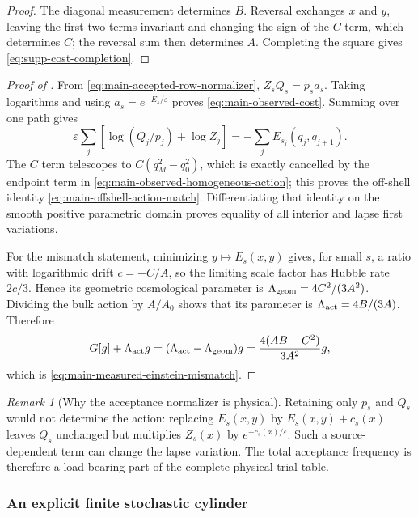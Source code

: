 \documentclass[11pt]{article}
\numberwithin{equation}{section}
\theoremstyle{definition}
\theoremstyle{remark}
\newtheorem{remark}[remark]{Remark}
\begin{document}
\begin{proof}
The diagonal measurement determines $B$.  Reversal exchanges $x$ and $y$,
leaving the first two terms invariant and changing the sign of the $C$ term,
which determines $C$; the reversal sum then determines $A$.  Completing the
square gives \eqref{eq:supp-cost-completion}.
\end{proof}

\begin{proof}[Proof of ]
From \eqref{eq:main-accepted-row-normalizer},
$Z_sQ_s=p_sa_s$.  Taking logarithms and using
$a_s=e^{-E_s/\varepsilon}$ proves \eqref{eq:main-observed-cost}.  Summing over
one path gives
\[
 \varepsilon\sum_j\left[\log(Q_j/p_j)+\log Z_j\right]
 =-\sum_jE_{s_j}(q_j,q_{j+1}).
\]
The $C$ term telescopes to $C(q_M^2-q_0^2)$, which is exactly cancelled by the
endpoint term in \eqref{eq:main-observed-homogeneous-action}; this proves the
off-shell identity \eqref{eq:main-offshell-action-match}.  Differentiating that
identity on the smooth positive parametric domain proves equality of all
interior and lapse first variations.

For the mismatch statement, minimizing $y\mapsto E_s(x,y)$ gives, for small
$s$, a ratio with logarithmic drift $c=-C/A$, so the limiting scale factor has
Hubble rate $2c/3$.  Hence its geometric cosmological parameter is
$\Lambda_{\rm geom}=4C^2/(3A^2)$.  Dividing the bulk action by $A/A_0$ shows
that its parameter is $\Lambda_{\rm act}=4B/(3A)$.  Therefore
\[
 G[g]+\Lambda_{\rm act}g
 =(\Lambda_{\rm act}-\Lambda_{\rm geom})g
 =\frac{4(AB-C^2)}{3A^2}g,
\]
which is \eqref{eq:main-measured-einstein-mismatch}.
\end{proof}

\begin{remark}[Why the acceptance normalizer is physical]
Retaining only $p_s$ and $Q_s$ would not determine the action: replacing
$E_s(x,y)$ by $E_s(x,y)+c_s(x)$ leaves $Q_s$ unchanged but multiplies $Z_s(x)$
by $e^{-c_s(x)/\varepsilon}$.  Such a source-dependent term can change the
lapse variation.  The total acceptance frequency is therefore a load-bearing
part of the complete physical trial table.
\end{remark}

\subsubsection{An explicit finite stochastic cylinder}
\end{document}
